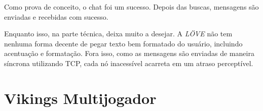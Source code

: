     Como prova de conceito, o chat foi um sucesso. Depois das buscas, mensagens são enviadas
    e recebidas com sucesso.
    
    Enquanto isso, na parte técnica, deixa muito a desejar. A \textit{LÖVE} não tem nenhuma
    forma decente de pegar texto bem formatado do usuário, incluindo acentuação e formatação.
    Fora isso, como as mensagens são enviadas de maneira síncrona utilizando TCP, cada nó
    inacessível acarreta em um atraso perceptível.
    

\section{Vikings Multijogador}
\label{sec:resultados:vikings}
